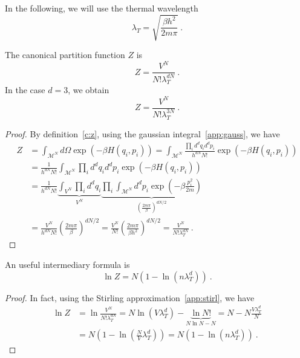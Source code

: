     In the following, we will use the thermal wavelength 
    \begin{equation*}
        \lambda_T = \sqrt{\frac{\beta h^2}{2 m \pi}} ~.
    \end{equation*}

    The canonical partition function $Z$ is 
    \begin{equation}\label{idcan}
        Z = \frac{V^N}{N! \lambda^{dN}_T} ~.
    \end{equation}
    In the case $d = 3$, we obtain 
    \begin{equation*}
        Z = \frac{V^N}{N! \lambda^{3N}_T} ~.
    \end{equation*}
    \begin{proof}
        By definition~\eqref{c:z}, using the gaussian integral~\eqref{app:gauss}, we have
        \begin{equation*}
        \begin{aligned}
            Z & = \int_{\mathcal M^N} d\Omega \exp(- \beta H (q_i, p_i)) = \int_{\mathcal M^N} \frac{\prod_i d^d q_i d^d p_i}{h^{dN} N!} \exp(- \beta H (q_i, p_i)) \\ & = \frac{1}{h^{dN} N!} \int_{\mathcal M^N} \prod_i d^d q_i d^d p_i \exp(- \beta H (q_i, p_i)) \\ & = \frac{1}{h^{dN} N!} \underbrace{\int_{ V^N} \prod_i d^d q_i}_{V^N} \underbrace{\prod_i \int_{\mathcal M^N} d^d p_i \exp(- \beta \frac{p^2_i}{2m})}_{(\frac{2 m \pi}{\beta})^{dN/2}} \\ & = \frac{V^N}{h^{dN} N!} (\frac{2 m \pi}{\beta})^{dN/2} = \frac{V^N}{ N!} (\frac{2 m \pi}{\beta h^2})^{dN/2} = \frac{V^N}{N! \lambda^{dN}_T} ~.
        \end{aligned}
        \end{equation*}
    \end{proof}
    An useful intermediary formula is 
    \begin{equation*}
        \ln Z = N (1 - \ln (n \lambda_T^d)) ~.
    \end{equation*}
    \begin{proof}
        In fact, using the Stirling approximation~\eqref{app:stirl}, we have
        \begin{equation*}
        \begin{aligned}
            \ln Z & = \ln \frac{V^N}{N! \lambda^{dN}_T}= N \ln (V \lambda_T^d) - \underbrace{\ln N!}_{N \ln N - N} = N - N \frac{V \lambda_T^d}{N} \\ & = N (1 - \ln (\frac{N}{V} \lambda_T^d)) = N (1 - \ln (n \lambda_T^d))  ~.
        \end{aligned}
        \end{equation*}
    \end{proof}
